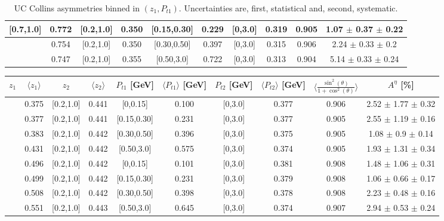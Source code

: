 \begin{table}[H]
\begin{tabular}{|c| c| c| c| c| c| c| c| c| c|}
[0.7,1.0]	&	0.772	&	[0.2,1.0]	&	0.350	&	[0.15,0.30]	&	0.229	&	[0,3.0]	&	0.319	&	0.905	& 1.07  $\pm$ 0.37  $\pm$ 0.22  	\\ \hline
[0.7,1.0]	&	0.754	&	[0.2,1.0]	&	0.350	&	[0.30,0.50]	&	0.397	&	[0,3.0]	&	0.315	&	0.906	& 2.24  $\pm$ 0.33  $\pm$ 0.2   	\\ \hline
[0.7,1.0]	&	0.747	&	[0.2,1.0]	&	0.355	&	[0.50,3.0]	&	0.722	&	[0,3.0]	&	0.313	&	0.904	& 5.14  $\pm$ 0.33  $\pm$ 0.24  	\\ \hline
\end{tabular}
\caption[UC Collins asymmetries binned in $(z_{1},P_{t1})$]{UC Collins asymmetries binned in $(z_{1},P_{t1})$. Uncertainties are, first, statistical and, second, systematic.}\label{tab:finalucptbins}
\end{table}

\begin{table}[H]\tiny
\centering
\begin{tabular}{|c| c| c| c| c| c| c| c| c| c|}
\hline
$z_1$& $\langle  z_{1}  \rangle$ & $z_2$ & $\langle  z_{2}\rangle$& $P_{t1}$ [GeV] & $\langle  P_{t1} \rangle$ [GeV] & $P_{t2}$ [GeV] &  $\langle P_{t2}\rangle$ [GeV]  &$\langle\frac{\sin^2(\theta)}{1+\cos^2(\theta)}\rangle$& $A^{\eta}$ [\%]   \\ \hline
[0.3,0.5]	&	0.375	&	[0.2,1.0]	&	0.441	&	[0,0.15]	&	0.100	&	[0,3.0]	&	0.377	&	0.906	&  2.52  $\pm$ 1.77  $\pm$ 0.32     \\ \hline
[0.3,0.5]	&	0.377	&	[0.2,1.0]	&	0.441	&	[0.15,0.30]	&	0.231	&	[0,3.0]	&	0.377	&	0.905	&  2.55  $\pm$ 1.19  $\pm$ 0.16     \\ \hline
[0.3,0.5]	&	0.383	&	[0.2,1.0]	&	0.442	&	[0.30,0.50]	&	0.396	&	[0,3.0]	&	0.375	&	0.905	&  1.08  $\pm$ 0.9  $\pm$ 0.14      \\ \hline
[0.3,0.5]	&	0.431	&	[0.2,1.0]	&	0.442	&	[0.50,3.0]	&	0.575	&	[0,3.0]	&	0.374	&	0.905	&  1.93  $\pm$ 1.31  $\pm$ 0.34     \\ \hline
\hline
[0.5,0.7]	&	0.496	&	[0.2,1.0]	&	0.442	&	[0,0.15]	&	0.101	&	[0,3.0]	&	0.381	&	0.908	&  1.48  $\pm$ 1.06  $\pm$ 0.31     \\ \hline
[0.5,0.7]	&	0.499	&	[0.2,1.0]	&	0.442	&	[0.15,0.30]	&	0.231	&	[0,3.0]	&	0.379	&	0.908	&  1.06  $\pm$ 0.66  $\pm$ 0.17     \\ \hline
[0.5,0.7]	&	0.508	&	[0.2,1.0]	&	0.442	&	[0.30,0.50]	&	0.398	&	[0,3.0]	&	0.378	&	0.908	&  2.23  $\pm$ 0.48  $\pm$ 0.16     \\ \hline
[0.5,0.7]	&	0.551	&	[0.2,1.0]	&	0.443	&	[0.50,3.0]	&	0.645	&	[0,3.0]	&	0.374	&	0.907	&  2.94  $\pm$ 0.53  $\pm$ 0.24     \\ \hline

\end{tabular}
\end{table}
